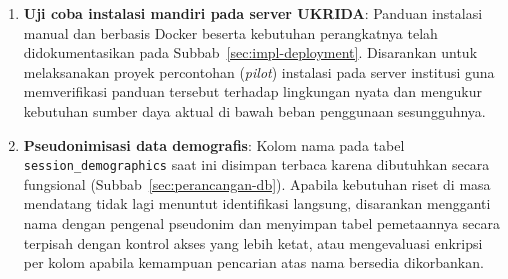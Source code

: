 \begin{enumerate}[leftmargin=2cm]
  \item \textbf{Uji coba instalasi mandiri pada server UKRIDA}: Panduan instalasi manual dan berbasis Docker beserta kebutuhan perangkatnya telah didokumentasikan pada Subbab~\ref{sec:impl-deployment}. Disarankan untuk melaksanakan proyek percontohan (\textit{pilot}) instalasi pada server institusi guna memverifikasi panduan tersebut terhadap lingkungan nyata dan mengukur kebutuhan sumber daya aktual di bawah beban penggunaan sesungguhnya.

  \item \textbf{Pseudonimisasi data demografis}: Kolom nama pada tabel \texttt{session\_demographics} saat ini disimpan terbaca karena dibutuhkan secara fungsional (Subbab~\ref{sec:perancangan-db}). Apabila kebutuhan riset di masa mendatang tidak lagi menuntut identifikasi langsung, disarankan mengganti nama dengan pengenal pseudonim dan menyimpan tabel pemetaannya secara terpisah dengan kontrol akses yang lebih ketat, atau mengevaluasi enkripsi per kolom apabila kemampuan pencarian atas nama bersedia dikorbankan.
\end{enumerate}
